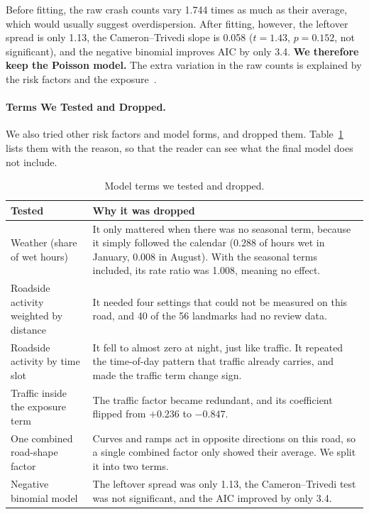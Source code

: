 \documentclass[11pt]{article}
\begin{document}
Before fitting, the raw crash counts vary 1.744 times as much as their average,
which would usually suggest overdispersion. After fitting, however, the
leftover spread is only 1.13, the Cameron--Trivedi slope is 0.058 ($t=1.43$,
$p=0.152$, not significant), and the negative binomial improves AIC by only
3.4. \textbf{We therefore keep the Poisson model.} The extra variation in the
raw counts is explained by the risk factors and the exposure~\cite{cameron1990}.

\paragraph{Terms We Tested and Dropped.}
We also tried other risk factors and model forms, and dropped them.
Table~\ref{tab:rejected} lists them with the reason, so that the reader can see
what the final model does not include.

\begin{table}[htbp]
\centering
\caption{Model terms we tested and dropped.}
\label{tab:rejected}
\small
\begin{tabular}{@{}p{4.1cm}p{10.6cm}@{}}
\toprule
\textbf{Tested} & \textbf{Why it was dropped} \\
\midrule
Weather (share of wet hours) & It only mattered when there was no seasonal
term, because it simply followed the calendar (0.288 of hours wet in January,
0.008 in August). With the seasonal terms included, its rate ratio was 1.008,
meaning no effect. \\
Roadside activity weighted by distance & It needed four settings that could not
be measured on this road, and 40 of the 56 landmarks had no review data. \\
Roadside activity by time slot & It fell to almost zero at night, just like
traffic. It repeated the time-of-day pattern that traffic already carries, and
made the traffic term change sign. \\
Traffic inside the exposure term & The traffic factor became redundant, and its
coefficient flipped from $+0.236$ to $-0.847$. \\
One combined road-shape factor & Curves and ramps act in opposite directions on
this road, so a single combined factor only showed their average. We split it
into two terms. \\
Negative binomial model & The leftover spread was only 1.13, the
Cameron--Trivedi test was not significant, and the AIC improved by only 3.4. \\
\bottomrule
\end{tabular}
\end{table}
\end{document}
